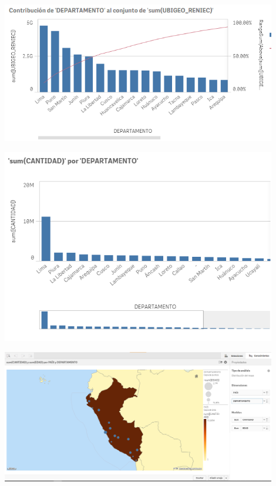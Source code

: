 \begin{center}
	\includegraphics[width=12cm]{./Imagenes/imgDesarrollo_3} 
\end{center}

\begin{center}
	\includegraphics[width=12cm]{./Imagenes/imgDesarrollo_4} 
\end{center}

\begin{center}
	\includegraphics[width=12cm]{./Imagenes/imgDesarrollo_5} 
\end{center}


